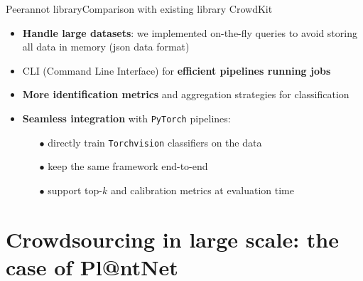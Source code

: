 \begin{frame}{Peerannot library}{Comparison with existing library CrowdKit}
    \begin{itemize}[itemsep=10pt]
        \item \textbf{Handle large datasets}: we implemented on-the-fly queries to avoid storing all data in memory (json data format)
        \item<2-> CLI (Command Line Interface) for \textbf{efficient pipelines running jobs}
        \item <3-> \textbf{More identification metrics} and aggregation strategies for classification
        \item <4-> \textbf{Seamless integration} with \texttt{PyTorch} pipelines:
        \begin{itemize}
            \item[$\bullet$] directly train \texttt{Torchvision} classifiers on the data
            \item[$\bullet$] keep the same framework end-to-end
            \item[$\bullet$] support top-$k$ and calibration metrics at evaluation time
        \end{itemize}
    \end{itemize}
\end{frame}

\section{Crowdsourcing in large scale: the case of Pl@ntNet}

